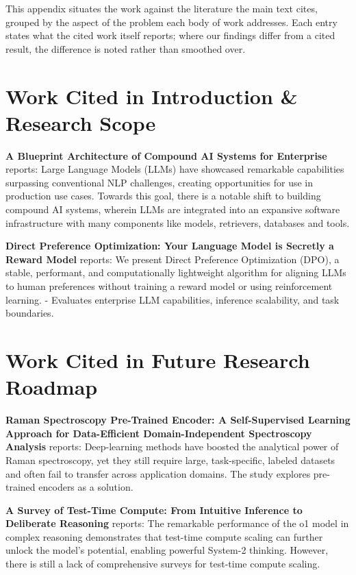 \documentclass[10pt,journal,compsoc,twocolumn]{IEEEtran}
\begin{document}
This appendix situates the work against the literature the main text cites, grouped by the aspect of the problem each body of work addresses. Each entry states what the cited work itself reports; where our findings differ from a cited result, the difference is noted rather than smoothed over.


\section{Work Cited in Introduction \& Research Scope}


\textbf{A Blueprint Architecture of Compound AI Systems for Enterprise} \cite{arxiv_2406_00584} reports: Large Language Models (LLMs) have showcased remarkable capabilities surpassing conventional NLP challenges, creating opportunities for use in production use cases. Towards this goal, there is a notable shift to building compound AI systems, wherein LLMs are integrated into an expansive software infrastructure with many components like models, retrievers, databases and tools.

\textbf{Direct Preference Optimization: Your Language Model is Secretly a Reward Model} \cite{arxiv_2305_18290} reports: We present Direct Preference Optimization (DPO), a stable, performant, and computationally lightweight algorithm for aligning LLMs to human preferences without training a reward model or using reinforcement learning. - Evaluates enterprise LLM capabilities, inference scalability, and task boundaries.


\section{Work Cited in Future Research Roadmap}


\textbf{Raman Spectroscopy Pre-Trained Encoder: A Self-Supervised Learning Approach for Data-Efficient Domain-Independent Spectroscopy Analysis} \cite{doaj_001772c2113c476d9d5d40452c8e10e1} reports: Deep-learning methods have boosted the analytical power of Raman spectroscopy, yet they still require large, task-specific, labeled datasets and often fail to transfer across application domains. The study explores pre-trained encoders as a solution.

\textbf{A Survey of Test-Time Compute: From Intuitive Inference to Deliberate Reasoning} \cite{arxiv_2501_02497} reports: The remarkable performance of the o1 model in complex reasoning demonstrates that test-time compute scaling can further unlock the model's potential, enabling powerful System-2 thinking. However, there is still a lack of comprehensive surveys for test-time compute scaling.
\end{document}
